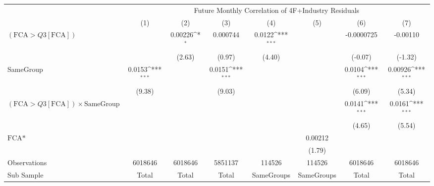 {
\def\sym#1{\ifmmode^{#1}\else\(^{#1}\)\fi}
\begin{tabular}{l*{7}{c}}
\hline\hline
                &\multicolumn{7}{c}{Future Monthly Correlation of 4F+Industry Residuals}                                                             \\\cmidrule(lr){2-8}
                &\multicolumn{1}{c}{(1)}         &\multicolumn{1}{c}{(2)}         &\multicolumn{1}{c}{(3)}         &\multicolumn{1}{c}{(4)}         &\multicolumn{1}{c}{(5)}         &\multicolumn{1}{c}{(6)}         &\multicolumn{1}{c}{(7)}         \\
\hline
 $ (\text{FCA} > Q3[\text{FCA}]) $ &                  &  0.00226\sym{*}  & 0.000744         &   0.0122\sym{***}&                  &-0.0000725         & -0.00110         \\
                &                  &   (2.63)         &   (0.97)         &   (4.40)         &                  &  (-0.07)         &  (-1.32)         \\
[1em]
SameGroup       &   0.0153\sym{***}&                  &   0.0151\sym{***}&                  &                  &   0.0104\sym{***}&  0.00926\sym{***}\\
                &   (9.38)         &                  &   (9.03)         &                  &                  &   (6.09)         &   (5.34)         \\
[1em]
 $ (\text{FCA} > Q3[\text{FCA}]) \times  {\text{SameGroup} }  $ &                  &                  &                  &                  &                  &   0.0141\sym{***}&   0.0161\sym{***}\\
                &                  &                  &                  &                  &                  &   (4.65)         &   (5.54)         \\
[1em]
$ \text{FCA*} $ &                  &                  &                  &                  &  0.00212         &                  &                  \\
                &                  &                  &                  &                  &   (1.79)         &                  &                  \\
\hline
Observations    &  6018646         &  6018646         &  5851137         &   114526         &   114526         &  6018646         &  6018646         \\
Sub Sample      &    Total         &    Total         &    Total         &SameGroups         &SameGroups         &    Total         &    Total         \\

\end{tabular}}

